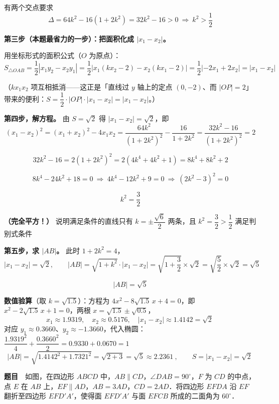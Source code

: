 有两个交点要求
\[\Delta=64k^2-16\left(1+2k^2\right)=32k^2-16>0\ \Longrightarrow\ k^2>\frac12\]

\textbf{第三步（本题最省力的一步）：把面积化成 $|x_1-x_2|$。}

用坐标形式的面积公式（$O$ 为原点）：
\[S_{\triangle OAB}=\frac12\left|x_1y_2-x_2y_1\right|=\frac12\left|x_1\left(kx_2-2\right)-x_2\left(kx_1-2\right)\right|=\frac12\left|-2x_1+2x_2\right|=\left|x_1-x_2\right|\]

（$kx_1x_2$ 项互相抵消——这正是「直线过 $y$ 轴上的定点 $(0,-2)$、而 $|OP|=2$」带来的便利：$S=\dfrac12\cdot|OP|\cdot\left|x_1-x_2\right|=\left|x_1-x_2\right|$。）

\textbf{第四步，解方程。} 由 $S=\sqrt2$ 得 $\left|x_1-x_2\right|=\sqrt2$，即
\[\left(x_1-x_2\right)^2=\left(x_1+x_2\right)^2-4x_1x_2=\frac{64k^2}{\left(1+2k^2\right)^2}-\frac{16}{1+2k^2}=\frac{32k^2-16}{\left(1+2k^2\right)^2}=2\]

\[32k^2-16=2\left(1+2k^2\right)^2=2\left(4k^4+4k^2+1\right)=8k^4+8k^2+2\]

\[8k^4-24k^2+18=0\ \Longrightarrow\ 4k^4-12k^2+9=0\ \Longrightarrow\ \left(2k^2-3\right)^2=0\]

\[k^2=\frac32\]

\textbf{（完全平方！）} 说明满足条件的直线只有 $k=\pm\dfrac{\sqrt6}{2}$ 两条，且 $k^2=\dfrac32>\dfrac12$ 满足判别式条件 

\textbf{第五步，求 $|AB|$。} 此时 $1+2k^2=4$，
\[\left|x_1-x_2\right|=\sqrt2,\qquad |AB|=\sqrt{1+k^2}\cdot\left|x_1-x_2\right|=\sqrt{1+\frac32}\times\sqrt2=\sqrt{\frac52}\times\sqrt2=\sqrt5\]

\[\boxed{|AB|=\sqrt5}\]

\begin{gktip}
\textbf{数值验算}（取 $k=\sqrt{1.5}$）：方程为 $4x^2-8\sqrt{1.5}\,x+4=0$，即 $x^2-2\sqrt{1.5}\,x+1=0$，两根 $x=\sqrt{1.5}\pm\sqrt{0.5}$，
\[x_1\approx1.9319,\quad x_2\approx0.5176,\quad \left|x_1-x_2\right|\approx1.4142=\sqrt2\ \]
对应 $y_1\approx0.3660$、$y_2\approx-1.3660$，代入椭圆：$\dfrac{1.9319^2}{4}+\dfrac{0.3660^2}{2}=0.9330+0.0670=1$ 
\[|AB|=\sqrt{1.4142^2+1.7321^2}=\sqrt{2+3}=\sqrt5\approx2.2361\ ,\qquad S=\left|x_1-x_2\right|=\sqrt2\ \]
\end{gktip}

\par\medskip


\textbf{题目}　如图，在四边形 $ABCD$ 中，$AB\parallel CD$，$\angle DAB=90^\circ$，$F$ 为 $CD$ 的中点，点 $E$ 在 $AB$ 上，$EF\parallel AD$，$AB=3AD$，$CD=2AD$．将四边形 $EFDA$ 沿 $EF$ 翻折至四边形 $EFD'A'$，使得面 $EFD'A'$ 与面 $EFCB$ 所成的二面角为 $60^\circ$．


